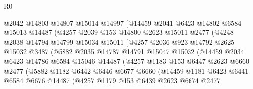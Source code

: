\begin{lexlean}{R0}
\begin{coremodule}
                    @2042
                    @14803
                    @14807
                    @15014
                    @14997
                    (@14459
                      @2041
                      @6423
                      @14802
                      @6584
                      @15013
                      @14487
                      (@4257
                        @2039
                        @153
                        @14800
                        @2623
                        @15011
                        @2477
                        (@4248
                          @2038
                          @14794
                          @14799
                          @15034
                          @15011
                          (@4257
                            @2036
                            @923
                            @14792
                            @2625
                            @15032
                            @3487
                            (@5882
                              @2035
                              @14787
                              @14791
                              @15047
                              @15032
                              (@14459
                                @2034
                                @6423
                                @14786
                                @6584
                                @15046
                                @14487
                                (@4257
                                  @1183
                                  @153
                                  @6447
                                  @2623
                                  @6660
                                  @2477
                                  (@5882
                                    @1182
                                    @6442
                                    @6446
                                    @6677
                                    @6660
                                    (@14459
                                      @1181
                                      @6423
                                      @6441
                                      @6584
                                      @6676
                                      @14487
                                      (@4257
                                        @1179
                                        @153
                                        @6439
                                        @2623
                                        @6674
                                        @2477

\end{coremodule}
\end{lexlean}
